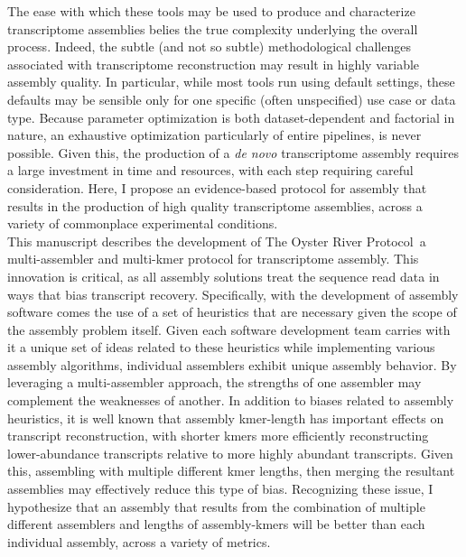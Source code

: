 \documentclass[10pt,letterpaper]{article}
\newcommand{\tit}{\textit}
\begin{document}
The ease with which these tools may be used to produce and characterize transcriptome assemblies belies the true complexity underlying the overall process. Indeed, the subtle (and not so subtle) methodological challenges associated with transcriptome reconstruction may result in highly variable assembly quality. In particular, while most tools run using default settings, these defaults may be sensible only for one specific (often unspecified) use case or data type. Because parameter optimization is both dataset-dependent and factorial in nature, an exhaustive optimization particularly of entire pipelines, is never possible. Given this, the production of a \tit{de novo} transcriptome assembly requires a large investment in time and resources, with each step requiring careful consideration. Here, I propose an evidence-based protocol for assembly that results in the production of high quality transcriptome assemblies, across a variety of commonplace experimental conditions. \\

\newpage
This manuscript describes the development of The Oyster River Protocol\footnotemark\ a multi-assembler and multi-kmer protocol for transcriptome assembly. This innovation is critical, as all assembly solutions treat the sequence read data in ways that bias transcript recovery. Specifically, with the development of assembly software comes the use of a set of heuristics that are necessary given the scope of the assembly problem itself. Given each software development team carries with it a unique set of ideas related to these heuristics while implementing various assembly algorithms, individual assemblers exhibit unique assembly behavior. By leveraging a multi-assembler approach, the strengths of one assembler may complement the weaknesses of another. In addition to biases related to assembly heuristics, it is well known that assembly kmer-length has important effects on transcript reconstruction, with shorter kmers more efficiently reconstructing lower-abundance transcripts relative to more highly abundant transcripts. Given this, assembling with multiple different kmer lengths, then merging the resultant assemblies may effectively reduce this type of bias. Recognizing these issue, I hypothesize that an assembly that results from the combination of multiple different assemblers and lengths of assembly-kmers will be better than each individual assembly, across a variety of metrics. 

\end{document}

